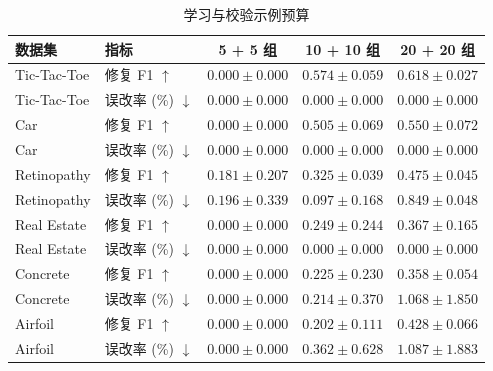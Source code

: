 \begin{table}[tb]
\centering
\caption{学习与校验示例预算}
\label{tab:example-budget}
\fontsize{8}{9.6}\selectfont
\setlength{\tabcolsep}{3pt}
\renewcommand{\arraystretch}{1.10}
\begin{tabular*}{\columnwidth}{@{\extracolsep{\fill}}llccc@{}}
\toprule
数据集 & 指标 & 5 + 5 组 & 10 + 10 组 & 20 + 20 组 \\
\midrule
Tic-Tac-Toe & 修复 F1 $\uparrow$ & $0.000\pm0.000$ & $0.574\pm0.059$ & $0.618\pm0.027$ \\
Tic-Tac-Toe & 误改率 (\%) $\downarrow$ & $0.000\pm0.000$ & $0.000\pm0.000$ & $0.000\pm0.000$ \\
\addlinespace[2pt]
Car & 修复 F1 $\uparrow$ & $0.000\pm0.000$ & $0.505\pm0.069$ & $0.550\pm0.072$ \\
Car & 误改率 (\%) $\downarrow$ & $0.000\pm0.000$ & $0.000\pm0.000$ & $0.000\pm0.000$ \\
\addlinespace[2pt]
Retinopathy & 修复 F1 $\uparrow$ & $0.181\pm0.207$ & $0.325\pm0.039$ & $0.475\pm0.045$ \\
Retinopathy & 误改率 (\%) $\downarrow$ & $0.196\pm0.339$ & $0.097\pm0.168$ & $0.849\pm0.048$ \\
\addlinespace[2pt]
Real Estate & 修复 F1 $\uparrow$ & $0.000\pm0.000$ & $0.249\pm0.244$ & $0.367\pm0.165$ \\
Real Estate & 误改率 (\%) $\downarrow$ & $0.000\pm0.000$ & $0.000\pm0.000$ & $0.000\pm0.000$ \\
\addlinespace[2pt]
Concrete & 修复 F1 $\uparrow$ & $0.000\pm0.000$ & $0.225\pm0.230$ & $0.358\pm0.054$ \\
Concrete & 误改率 (\%) $\downarrow$ & $0.000\pm0.000$ & $0.214\pm0.370$ & $1.068\pm1.850$ \\
\addlinespace[2pt]
Airfoil & 修复 F1 $\uparrow$ & $0.000\pm0.000$ & $0.202\pm0.111$ & $0.428\pm0.066$ \\
Airfoil & 误改率 (\%) $\downarrow$ & $0.000\pm0.000$ & $0.362\pm0.628$ & $1.087\pm1.883$ \\
\bottomrule
\end{tabular*}
\end{table}
